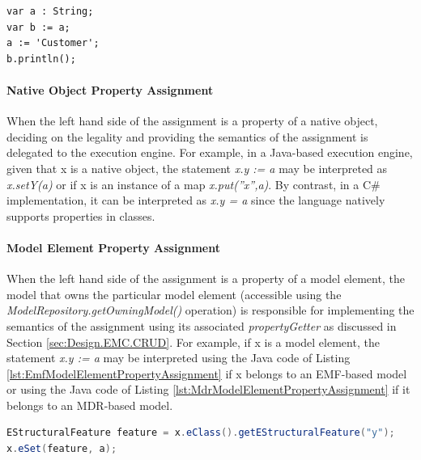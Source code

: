 \begin{lstlisting}[basicstyle=\ttfamily\footnotesize, flexiblecolumns=true, numbers=none, nolol=true, caption=Assigning the value of a variable by value, label=lst:VariableAssignmentByValue, numbers=left, language=EOL, tabsize=2]
var a : String;
var b := a;
a := 'Customer';
b.println();
\end{lstlisting}

\paragraph{Native Object Property Assignment}

When the left hand side of the assignment is a property of a native object, deciding on the legality and providing the semantics of the assignment is delegated to the execution engine. For example, in a Java-based execution engine, given that x is a native object, the statement \emph{x.y := a} may be interpreted as \emph{x.setY(a)} or if x is an instance of a map \emph{x.put(''x'',a)}. By contrast, in a C\# implementation, it can be interpreted as \emph{x.y = a} since
the language natively supports properties in classes.

\paragraph{Model Element Property Assignment}

When the left hand side of the assignment is a property of a model element, the model that owns the particular model element (accessible using the \emph{ModelRepository.getOwningModel() }operation) is responsible for implementing the semantics of the assignment using its associated \emph{propertyGetter} as discussed in Section \ref{sec:Design.EMC.CRUD}. For example, if x is a model element, the statement \emph{x.y := a} may be interpreted using the Java code of Listing \ref{lst:EmfModelElementPropertyAssignment} if x belongs to an EMF-based model or using the Java code of Listing \ref{lst:MdrModelElementPropertyAssignment} if it belongs to an MDR-based model.

\begin{lstlisting}[basicstyle=\ttfamily\footnotesize, flexiblecolumns=true, numbers=none, nolol=true, caption=Java code that assigns the value of a property of a model element that belongs to an EMF-based model, label=lst:EmfModelElementPropertyAssignment, numbers=left, language=Java, tabsize=2]
EStructuralFeature feature = x.eClass().getEStructuralFeature("y");
x.eSet(feature, a);
\end{lstlisting}

